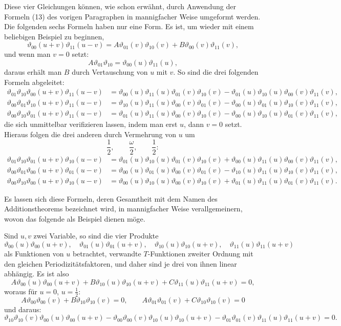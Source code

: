 \documentclass[11pt]{article}
\providecommand{\tht}{\vartheta}
\begin{document}
Diese vier Gleichungen können, wie schon erwähnt, durch Anwendung der Formeln (13) des vorigen Paragraphen in mannigfacher Weise umgeformt werden. Die folgenden sechs Formeln haben nur eine Form. Es ist, um wieder mit einem beliebigen Beispiel zu beginnen,
\[
\tht_{00}(u+v)\tht_{11}(u-v)=A\tht_{01}(v)\tht_{10}(v)+B\tht_{00}(v)\tht_{11}(v),
\]
und wenn man $v=0$ setzt:
\[
A\tht_{01}\tht_{10}=\tht_{00}(u)\tht_{11}(u),
\]
daraus erhält man $B$ durch Vertauschung von $u$ mit $v$. So sind die drei folgenden Formeln abgeleitet:
\begin{align}
\tht_{01}\tht_{10}\tht_{00}(u+v)\tht_{11}(u-v)
&=\tht_{00}(u)\tht_{11}(u)\tht_{01}(v)\tht_{10}(v)
 -\tht_{01}(u)\tht_{10}(u)\tht_{00}(v)\tht_{11}(v), \tag{5}\\
\tht_{00}\tht_{01}\tht_{10}(u+v)\tht_{11}(u-v)
&=\tht_{10}(u)\tht_{11}(u)\tht_{00}(v)\tht_{01}(v)
 -\tht_{00}(u)\tht_{01}(u)\tht_{10}(v)\tht_{11}(v), \tag{6}\\
\tht_{00}\tht_{10}\tht_{01}(u+v)\tht_{11}(u-v)
&=\tht_{01}(u)\tht_{11}(u)\tht_{00}(v)\tht_{10}(v)
 -\tht_{00}(u)\tht_{10}(u)\tht_{01}(v)\tht_{11}(v), \tag{7}
\end{align}
die sich unmittelbar verifizieren lassen, indem man erst $u$, dann $v=0$ setzt. Hieraus folgen die drei anderen durch Vermehrung von $u$ um
\[
\frac12,\qquad \frac\omega2,\qquad \frac12:
\]
\begin{align}
\tht_{01}\tht_{10}\tht_{01}(u+v)\tht_{10}(u-v)
&=\tht_{01}(u)\tht_{10}(u)\tht_{01}(v)\tht_{10}(v)
 +\tht_{00}(u)\tht_{11}(u)\tht_{00}(v)\tht_{11}(v), \tag{8}\\
\tht_{00}\tht_{01}\tht_{00}(u+v)\tht_{01}(u-v)
&=\tht_{00}(u)\tht_{01}(u)\tht_{00}(v)\tht_{01}(v)
 -\tht_{10}(u)\tht_{11}(u)\tht_{10}(v)\tht_{11}(v), \tag{9}\\
\tht_{00}\tht_{10}\tht_{00}(u+v)\tht_{10}(u-v)
&=\tht_{00}(u)\tht_{10}(u)\tht_{00}(v)\tht_{10}(v)
 +\tht_{01}(u)\tht_{11}(u)\tht_{01}(v)\tht_{11}(v). \tag{10}
\end{align}

Es lassen sich diese Formeln, deren Gesamtheit mit dem Namen des Additionstheorems bezeichnet wird, in mannigfacher Weise verallgemeinern, wovon das folgende als Beispiel dienen möge.

Sind $u,v$ zwei Variable, so sind die vier Produkte
\[
\tht_{00}(u)\tht_{00}(u+v),\quad
\tht_{01}(u)\tht_{01}(u+v),\quad
\tht_{10}(u)\tht_{10}(u+v),\quad
\tht_{11}(u)\tht_{11}(u+v)
\]
als Funktionen von $u$ betrachtet, verwandte $T$-Funktionen zweiter Ordnung mit den gleichen Periodizitätsfaktoren, und daher sind je drei von ihnen linear abhängig. Es ist also
\[
A\tht_{00}(u)\tht_{00}(u+v)+B\tht_{10}(u)\tht_{10}(u+v)+C\tht_{11}(u)\tht_{11}(u+v)=0,
\]
woraus für $u=0$, $u=\frac12$:
\[
A\tht_{00}\tht_{00}(v)+B\tht_{10}\tht_{10}(v)=0,
\qquad
A\tht_{01}\tht_{01}(v)+C\tht_{10}\tht_{10}(v)=0
\]
und daraus:
\begin{equation}
\tht_{10}\tht_{10}(v)\tht_{00}(u)\tht_{00}(u+v)
-\tht_{00}\tht_{00}(v)\tht_{10}(u)\tht_{10}(u+v)
-\tht_{01}\tht_{01}(v)\tht_{11}(u)\tht_{11}(u+v)=0.
\tag{11}
\end{equation}
\end{document}
